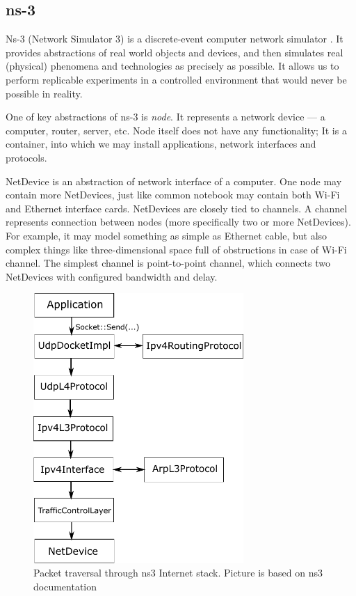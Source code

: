 \subsection {ns-3}

Ns-3 (Network Simulator 3) is a discrete-event computer network simulator \cite{ns3}. It provides abstractions of real world objects and devices, and then simulates real (physical) phenomena and technologies as precisely as possible.  It allows us to perform replicable  experiments in a controlled environment that would never be possible in reality.

One of key abstractions of ns-3 is \emph{node}. It represents a network device --- a computer, router, server, etc. Node itself does not have any functionality; It is a container, into which we may install applications, network interfaces and protocols.

NetDevice is an abstraction of network interface of a computer. One node may contain more NetDevices, just like common notebook may contain both Wi-Fi and Ethernet interface cards. NetDevices are closely tied to channels. A channel represents connection between nodes (more specifically two or more NetDevices). For example, it may model something as simple as Ethernet cable, but also complex things like three-dimensional space full of obstructions in case of Wi-Fi channel. The simplest channel is point-to-point channel, which connects two NetDevices with configured bandwidth and delay.


\begin{figure}
	\centering
	\includegraphics[width=80mm]{drawings/ns3_internet_stack}
	\captionsetup{justification=centering}
	\caption{Packet traversal through ns3 Internet stack. Picture is based on ns3 documentation \cite[p. 88]{ns3Doc}}
	\label{fig13:ns3}
\end{figure}

